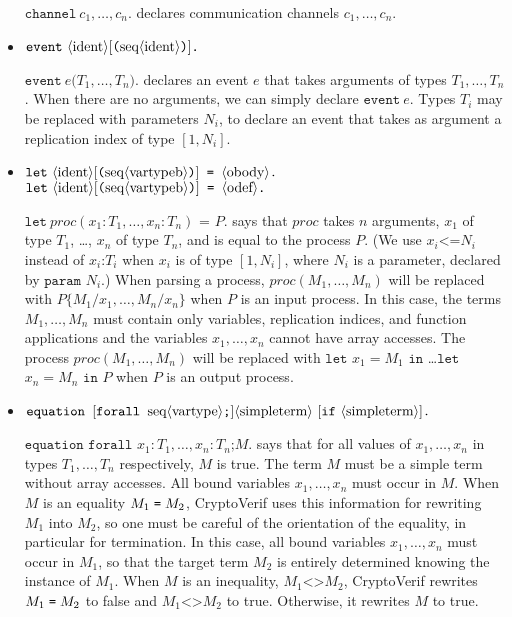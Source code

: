 \begin{itemize}
$\texttt{channel}\ c_1, \ldots, c_n\texttt{.}$ declares communication channels
$c_1, \ldots, c_n$.
\fi

\item $\texttt{event}\ \nonterm{ident}[\texttt{(}\seq{ident}\texttt{)}]\texttt{.}$

$\texttt{event}\ e\texttt{(}T_1, \ldots, T_n\texttt{)}\texttt{.}$
declares an event $e$ that takes arguments of types $T_1, \ldots, T_n$.
When there are no arguments, we can simply declare 
$\texttt{event}\ e\texttt{.}$ Types $T_i$ may be replaced with
parameters $N_i$, to declare an event that takes as argument
a replication index of type $[1,N_i]$.


\item $\texttt{let}\ \nonterm{ident}[\texttt{(}\seq{vartypeb}\texttt{)}]\texttt{ = }\oprocess\texttt{.}$\\
$\texttt{let}\ \nonterm{ident}[\texttt{(}\seq{vartypeb}\texttt{)}]\texttt{ = }\iprocess\texttt{.}$

$\texttt{let}\ \mathit{proc}(x_1:T_1, \dots, x_n:T_n)\texttt{ = }P\texttt{.}$ says that $\mathit{proc}$ takes $n$ arguments, $x_1$ of type $T_1$, \dots, $x_n$ of type $T_n$, and is equal to the process
$P$. (We use $x_i \texttt{<=} N_i$ instead of
  $x_i\texttt{:} T_i$ when $x_i$ is of type $[1,N_i]$, where $N_i$ is
  a parameter, declared by $\texttt{param }N_i$.)
When parsing a process, $\mathit{proc}(M_1, \dots, M_n)$ will be replaced with $P\{M_1/x_1, \dots, M_n/x_n\}$ when $P$ is an input process. In this case, the terms $M_1, \dots, M_n$ must contain only variables, replication indices, and function applications and the variables $x_1, \dots, x_n$ cannot have array accesses.
The process $\mathit{proc}(M_1, \dots, M_n)$ will be replaced with $\texttt{let}$ $x_1 = M_1$ $\texttt{in}$ \dots $\texttt{let}$ $x_n = M_n$ $\texttt{in}$ $P$ when $P$ is an output process.

\item $\texttt{equation }[\texttt{forall }\seq{vartype}\texttt{;}]\nonterm{simpleterm}\ [\texttt{if}\ \nonterm{simpleterm}]\texttt{.}$

$\texttt{equation forall }x_1:T_1, \ldots, x_n:T_n\texttt{;}M\texttt{.}$ says
that for all values of $x_1, \ldots, x_n$ in types $T_1, \ldots, T_n$
respectively,
$M$ is true. The term $M$ must be a simple term without array accesses.
All bound variables $x_1, \dots, x_n$ must occur in $M$.
%
When $M$ is an equality $M_1 \mathrel{\texttt{=}}  M_2$, CryptoVerif uses this information
for rewriting $M_1$ into $M_2$, so one must be careful of the orientation
of the equality, in particular for termination. 
In this case, all bound variables $x_1, \dots, x_n$ must occur in $M_1$,
so that the target term $M_2$ is entirely determined knowing the instance of $M_1$.
%
When $M$ is an inequality, $M_1 \texttt{<>} M_2$, CryptoVerif rewrites
$M_1 \mathrel{\texttt{=}}  M_2$ to false and $M_1 \texttt{<>} M_2$ to true.
%
Otherwise, it rewrites $M$ to true.


\end{itemize}

